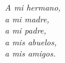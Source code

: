 \begin{dedication}
    \textit{
        A mi hermano,\\
        a mi madre,\\
        a mi padre,\\
        a mis abuelos,\\
        a mis amigos.
    }
\end{dedication}